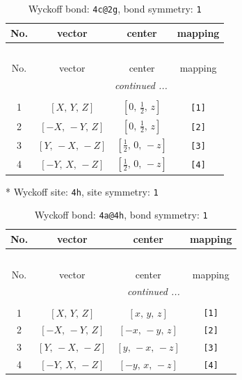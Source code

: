 \documentclass[fleqn,8pt]{jsarticle}
\begin{document}
\begin{longtable}{cccc}
\caption{Wyckoff bond: {\tt 4c@2g}, bond symmetry: {\tt 1}}
 \\
 \hline \hline
No. & vector & center & mapping \\ \hline \endfirsthead

\multicolumn{3}{l}{\tablename\ \thetable{}} \\
 \hline \hline
No. & vector & center & mapping \\ \hline \endhead

 \hline \hline
\multicolumn{3}{r}{\footnotesize\it continued ...} \\ \endfoot

 \hline \hline
\multicolumn{3}{r}{} \\ \endlastfoot

1 & $\left[ X,\, Y,\, Z \right]$ & $\left[ 0,\, \frac{1}{2},\, z \right]$ & {\tt [1]} \\ \hline
2 & $\left[ - X,\, - Y,\, Z \right]$ & $\left[ 0,\, \frac{1}{2},\, z \right]$ & {\tt [2]} \\ \hline
3 & $\left[ Y,\, - X,\, - Z \right]$ & $\left[ \frac{1}{2},\, 0,\, - z \right]$ & {\tt [3]} \\ \hline
4 & $\left[ - Y,\, X,\, - Z \right]$ & $\left[ \frac{1}{2},\, 0,\, - z \right]$ & {\tt [4]} \\
\end{longtable}
* Wyckoff site: {\tt 4h}, site symmetry: {\tt 1}
\renewcommand{\arraystretch}{1.2}
\begin{longtable}{cccc}
\caption{Wyckoff bond: {\tt 4a@4h}, bond symmetry: {\tt 1}}
 \\
 \hline \hline
No. & vector & center & mapping \\ \hline \endfirsthead

\multicolumn{3}{l}{\tablename\ \thetable{}} \\
 \hline \hline
No. & vector & center & mapping \\ \hline \endhead

 \hline \hline
\multicolumn{3}{r}{\footnotesize\it continued ...} \\ \endfoot

 \hline \hline
\multicolumn{3}{r}{} \\ \endlastfoot

1 & $\left[ X,\, Y,\, Z \right]$ & $\left[ x,\, y,\, z \right]$ & {\tt [1]} \\ \hline
2 & $\left[ - X,\, - Y,\, Z \right]$ & $\left[ - x,\, - y,\, z \right]$ & {\tt [2]} \\ \hline
3 & $\left[ Y,\, - X,\, - Z \right]$ & $\left[ y,\, - x,\, - z \right]$ & {\tt [3]} \\ \hline
4 & $\left[ - Y,\, X,\, - Z \right]$ & $\left[ - y,\, x,\, - z \right]$ & {\tt [4]} \\
\end{longtable}
\end{document}
